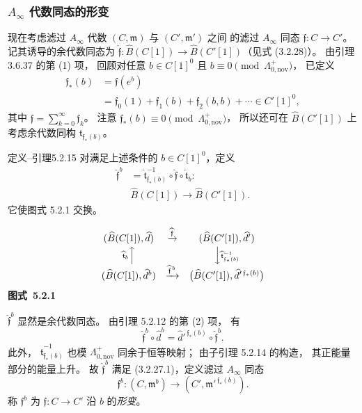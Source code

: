 \subsubsection{\texorpdfstring{$A_\infty$}{A-infinity} 代数同态的形变}
\label{subsubsec:5-2-2-2}

现在考虑滤过 $A_\infty$ 代数
$(C,\mathfrak m)$ 与 $(C',\mathfrak m')$ 之间
的滤过 $A_\infty$ 同态
$\mathfrak f:C\to C'$。
记其诱导的余代数同态为
$\widehat{\mathfrak f}:\widehat B(C[1])
\to\widehat B(C'[1])$（见式 (3.2.28)）。
由引理 3.6.37 的第 \textup{(1)} 项，
回顾对任意
$b\in C[1]^0$ 且
$b\equiv0\pmod{\Lambda_{0,\mathrm{nov}}^+}$，
已定义
\[
\begin{aligned}
\mathfrak f_*(b)
&=\mathfrak f(e^b)\\
&=\mathfrak f_0(1)+\mathfrak f_1(b)
+\mathfrak f_2(b,b)+\cdots
\in C'[1]^0,
\end{aligned}
\]
其中 $\mathfrak f=\sum_{k=0}^{\infty}\mathfrak f_k$。
注意 $\mathfrak f_*(b)\equiv0
\pmod{\Lambda_{0,\mathrm{nov}}^+}$，
所以还可在 $\widehat B(C'[1])$
上考虑余代数同构
$\widehat{\mathfrak t}_{\mathfrak f_*(b)}$。

\begin{statement}{定义--引理}{5.2.15}\label{deflem:5-2-15}
对满足上述条件的 $b\in C[1]^0$，定义
\[
\begin{aligned}
\widehat{\mathfrak f}^{b}
&=\widehat{\mathfrak t}_{\mathfrak f_*(b)}^{-1}
\circ\widehat{\mathfrak f}
\circ\widehat{\mathfrak t}_b:\\
&\widehat B(C[1])\longrightarrow\widehat B(C'[1]).
\end{aligned}
\]
它使图式 5.2.1 交换。
{\renewcommand{\thefigure}{5.2.1}
\begin{center}
\[
\begin{array}{ccc}
(\widehat B(C[1]),\widehat d)
&\xrightarrow{\widehat{\mathfrak f}}
&(\widehat B(C'[1]),\widehat d')\\[0.5ex]
\scriptstyle{\widehat{\mathfrak t}_b}\Big\uparrow
&&\Big\downarrow\scriptstyle{
\widehat{\mathfrak t}_{\mathfrak f_*(b)}^{-1}}\\[0.5ex]
(\widehat B(C[1]),\widehat d^b)
&\xrightarrow{\widehat{\mathfrak f}^{\,b}}
&\bigl(\widehat B(C'[1]),
\widehat d'^{\,\mathfrak f_*(b)}\bigr)
\end{array}
\]
{\normalfont\bfseries 图式~\thefigure}\label{diag:5-2-1}
\end{center}}
$\widehat{\mathfrak f}^{b}$ 显然是余代数同态。
由引理 5.2.12 的第 \textup{(2)} 项，
有
\[
\widehat{\mathfrak f}^{b}\circ\widehat d^b
=\widehat d'^{\,\mathfrak f_*(b)}
\circ\widehat{\mathfrak f}^{b}.
\]
此外，
$\widehat{\mathfrak t}_{\mathfrak f_*(b)}^{-1}$
也模 $\Lambda_{0,\mathrm{nov}}^+$ 同余于恒等映射；
由子引理 5.2.14 的构造，
其正能量部分的能量上升。
故 $\widehat{\mathfrak f}^{b}$
满足 (3.2.27.1)，定义滤过 $A_\infty$ 同态
\[
\mathfrak f^b:(C,\mathfrak m^b)
\longrightarrow
(C',\mathfrak m'^{\,\mathfrak f_*(b)}).
\]
称 $\mathfrak f^b$ 为
$\mathfrak f:C\to C'$ 沿 $b$ 的\emph{形变}。
\end{statement}

